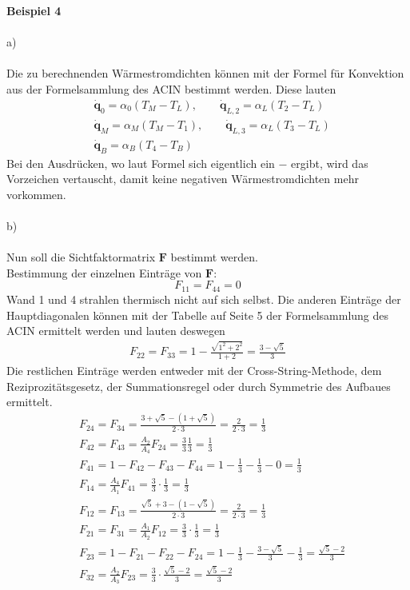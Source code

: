 \newpage
\noindent
\textbf{Beispiel 4} \\ \\
a) \\ \\
Die zu berechnenden Wärmestromdichten können mit der Formel für Konvektion aus der Formelsammlung des ACIN bestimmt werden. Diese lauten
\begin{align*}
	&\dot{\textbf{q}}_0 = \alpha_0 \left(T_M - T_L\right) , \qquad \dot{\textbf{q}}_{L,2} = \alpha_L \left(T_2 - T_L\right) \\
	&\dot{\textbf{q}}_M = \alpha_M \left(T_M - T_1\right) , \qquad \dot{\textbf{q}}_{L,3} = \alpha_L \left(T_3 - T_L\right) \\
	&\dot{\textbf{q}}_B = \alpha_B \left(T_4 - T_B\right)
\end{align*}
Bei den Ausdrücken, wo laut Formel sich eigentlich ein \(-\) ergibt, wird das Vorzeichen vertauscht, damit keine negativen Wärmestromdichten mehr vorkommen. \\ \\
b) \\ \\
Nun soll die Sichtfaktormatrix \(\textbf{F}\) bestimmt werden.\\
Bestimmung der einzelnen Einträge von \(\textbf{F}\):
\[
	F_{11} = F_{44} = 0
\]
Wand 1 und 4 strahlen thermisch nicht auf sich selbst. Die anderen Einträge der Hauptdiagonalen können mit der Tabelle auf Seite 5 der Formelsammlung des ACIN ermittelt werden und lauten deswegen
\begin{align*}
	F_{22} = F_{33} = 1 -\frac{\sqrt{1^2+2^2}}{1+2} = \frac{3 - \sqrt{5}}{3}
\end{align*}
Die restlichen Einträge werden entweder mit der Cross-String-Methode, dem Reziprozitätsgesetz, der Summationsregel oder durch Symmetrie des Aufbaues ermittelt.
\begin{align*}
	&F_{24} = F_{34} = \frac{3 + \sqrt{5} - \left(1 + \sqrt{5}\right)}{2\cdot3} = \frac{2}{2 \cdot 3} = \frac{1}{3} \\
	&F_{42} = F_{43} = \frac{A_2}{A_4}F_{24} = \frac{3}{3} \frac{1}{3} = \frac{1}{3} \\
	&F_{41} = 1 - F_{42} - F_{43} - F_{44} = 1 - \frac{1}{3} - \frac{1}{3} - 0 = \frac{1}{3} \\
	&F_{14} = \frac{A_4}{A_1}F_{41} = \frac{3}{3} \cdot \frac{1}{3} = \frac{1}{3} \\
	&F_{12} = F_{13} = \frac{\sqrt{5} + 3 - \left(1 - \sqrt{5}\right)}{2\cdot 3} = \frac{2}{2 \cdot 3} = \frac{1}{3} \\
	&F_{21} = F_{31} = \frac{A_1}{A_2}F_{12} = \frac{3}{3}\cdot \frac{1}{3} = \frac{1}{3} \\
	&F_{23} = 1 - F_{21} - F_{22} - F_{24} = 1 - \frac{1}{3} -\frac{3 - \sqrt{5}}{3} - \frac{1}{3} = \frac{\sqrt{5} - 2}{3} \\
	&F_{32} = \frac{A_2}{A_3}F_{23} = \frac{3}{3} \cdot \frac{\sqrt{5} - 2}{3} = \frac{\sqrt{5} - 2}{3}
\end{align*}
